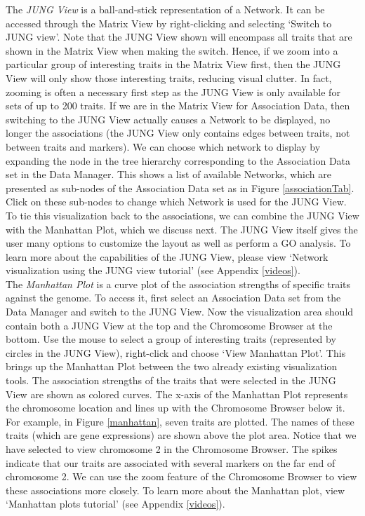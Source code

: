 \documentclass{article}
\begin{document}
The {\it JUNG View} is a ball-and-stick representation of a Network. It can be accessed through the Matrix View by right-clicking and selecting `Switch to JUNG view'. Note that the JUNG View shown will encompass all traits that are shown in the Matrix View when making the switch. Hence, if we zoom into a particular group of interesting traits in the Matrix View first, then the JUNG View will only show those interesting traits, reducing visual clutter. In fact, zooming is often a necessary first step as the JUNG View is only available for sets of up to 200 traits. If we are in the Matrix View for Association Data, then switching to the JUNG View actually causes a Network to be displayed, no longer the associations (the JUNG View only contains edges between traits, not between traits and markers). We can choose which network to display by expanding the node in the tree hierarchy corresponding to the Association Data set in the Data Manager. This shows a list of available Networks, which are presented as sub-nodes of the Association Data set as in Figure \ref{associationTab}. Click on these sub-nodes to change which Network is used for the JUNG View. To tie this visualization back to the associations, we can combine the JUNG View with the Manhattan Plot, which we discuss next. The JUNG View itself gives the user many options to customize the layout as well as perform a GO analysis. To learn more about the capabilities of the JUNG View, please view `Network visualization using the JUNG view tutorial' (see Appendix \ref{videos}).\\

The {\it Manhattan Plot} is a curve plot of the association strengths of specific traits against the genome. To access it, first select an Association Data set from the Data Manager and switch to the JUNG View. Now the visualization area should contain both a JUNG View at the top and the Chromosome Browser at the bottom. Use the mouse to select a group of interesting traits (represented by circles in the JUNG View), right-click and choose `View Manhattan Plot'. This brings up the Manhattan Plot between the two already existing visualization tools. The association strengths of the traits that were selected in the JUNG View are shown as colored curves. The x-axis of the Manhattan Plot represents the chromosome location and lines up with the Chromosome Browser below it. For example, in Figure \ref{manhattan}, seven traits are plotted. The names of these traits (which are gene expressions) are shown above the plot area. Notice that we have selected to view chromosome 2 in the Chromosome Browser. The spikes indicate that our traits are associated with several markers on the far end of chromosome 2. We can use the zoom feature of the Chromosome Browser to view these associations more closely. To learn more about the Manhattan plot, view `Manhattan plots tutorial' (see Appendix \ref{videos}).\\
\end{document}
